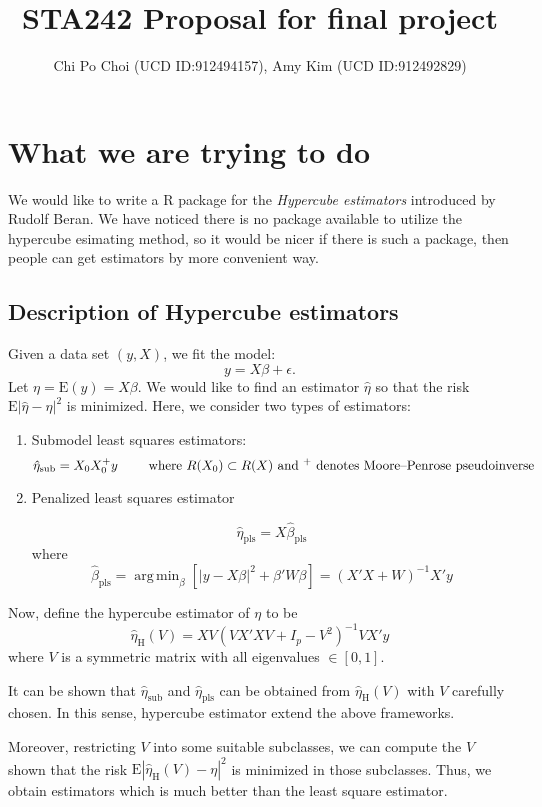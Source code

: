 \documentclass[draft]{article}
\title{STA242 Proposal for final project}
\author{Chi Po Choi (UCD ID:912494157), Amy Kim (UCD ID:912492829)}
\DeclareMathOperator*{\argmin}{arg\,min}
\begin{document}
\maketitle

\section{What we are trying to do}
We would like to write a R package for the \emph{Hypercube estimators} \cite{beran2014hypercube} introduced by Rudolf Beran. We have noticed there is no package available to utilize the hypercube esimating method, so it would be nicer if there is such a package, then people can get estimators by more convenient way. 

\subsection{Description of Hypercube estimators}
Given a data set $(y, X)$, we fit the model:
$$
y = X\beta + \epsilon.
$$
Let $\eta = \text{E}(y) = X\beta$. We would like to find an estimator $\hat{\eta}$ so that the risk $\text{E} | \hat{\eta} - \eta|^2$ is minimized. Here, we consider two types of estimators:

\begin{enumerate}
	\item Submodel least squares estimators:
	$$
		\hat{\eta}_\text{sub} = X_0 X_0^+ y \qquad \text{ where $R(X_0) \subset R(X)$ and \textsuperscript{+} denotes Moore–Penrose pseudoinverse}
	$$
	\item Penalized least squares estimator

	$$
		\hat{\eta}_\text{pls} = X \hat{\beta}_\text{pls}
	$$
	where 
	$$
		\hat{\beta}_\text{pls} = \argmin_{\beta} [ | y - X\beta |^2 + \beta' W \beta ] = (X'X + W)^{-1} X' y 
	$$
\end{enumerate}

Now, define the hypercube estimator of $\eta$ to be
$$
\hat{\eta}_\text{H} (V) = X V (V X'X V + I_p - V^2)^{-1} V X' y
$$
where $V$ is a symmetric matrix with all eigenvalues $\in [0,1]$.

It can be shown that $\hat{\eta}_\text{sub}$ and $\hat{\eta}_\text{pls}$ can be obtained from $\hat{\eta}_\text{H} (V)$ with $V$ carefully chosen. In this sense, hypercube estimator extend the above frameworks.

Moreover, restricting $V$ into some suitable subclasses, we can compute the $V$ shown that the risk $\text{E} | \hat{\eta}_\text{H}(V) - \eta|^2$ is minimized in those subclasses. Thus, we obtain estimators which is much better than the least square estimator. 
\end{document}
